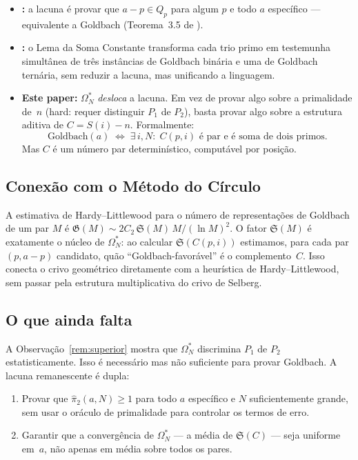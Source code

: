 \documentclass[12pt,a4paper]{article}
\theoremstyle{definition}
\theoremstyle{remark}
\newcommand{\Oms}{\Omega^*_N}        %
\newcommand{\Ss}{\mathfrak{S}}       %
\begin{document}
	\begin{itemize}
		\item \textbf{\cite{bandeira2026unif}:} a lacuna é provar que
		$a-p\in Q_p$ para algum $p$ e todo $a$ específico ---
		equivalente a Goldbach (Teorema~3.5 de \cite{bandeira2026unif}).
		
		\item \textbf{\cite{bandeira2026soma}:} o Lema da Soma Constante
		transforma cada trio primo em testemunha simultânea de três instâncias
		de Goldbach binária e uma de Goldbach ternária, sem reduzir a lacuna,
		mas unificando a linguagem.
		
		\item \textbf{Este paper:} $\Oms$ \emph{desloca} a lacuna.
		Em vez de provar algo sobre a primalidade de~$n$
		(hard: requer distinguir $P_1$ de $P_2$),
		basta provar algo sobre a estrutura aditiva de $C=S(i)-n$.
		Formalmente:
		\[
		\text{Goldbach}(a)
		\;\Leftrightarrow\;
		\exists\,i,N:\;C(p,i)\text{ é par e é soma de dois primos.}
		\]
		Mas $C$ é um número par determinístico, computável por posição.
	\end{itemize}
	
	\subsection{Conexão com o Método do Círculo}
	
	A estimativa de Hardy--Littlewood para o número de representações de
	Goldbach de um par $M$ é $\mathfrak{G}(M)\sim 2C_2\,\Ss(M)\,M/(\ln M)^2$.
	O fator $\Ss(M)$ é exatamente o núcleo de $\Oms$: ao calcular
	$\Ss(C(p,i))$ estimamos, para cada par $(p,a{-}p)$ candidato, quão
	``Goldbach-favorável'' é o complemento~$C$.
	Isso conecta o crivo geométrico diretamente com a heurística de
	Hardy--Littlewood, sem passar pela estrutura multiplicativa do crivo de
	Selberg.
	
	\subsection{O que ainda falta}
	
	A Observação~\ref{rem:superior} mostra que $\Oms$ discrimina $P_1$ de $P_2$
	estatisticamente.
	Isso é necessário mas não suficiente para provar Goldbach.
	A lacuna remanescente é dupla:
	\begin{enumerate}
		\item Provar que $\hat\pi_2(a,N)\geq1$ para todo $a$ específico e $N$
		suficientemente grande, sem usar o oráculo de primalidade para controlar
		os termos de erro.
		\item Garantir que a convergência de $\Oms$ --- a média de $\Ss(C)$ ---
		seja uniforme em~$a$, não apenas em média sobre todos os pares.
	\end{enumerate}
	
\end{document}
